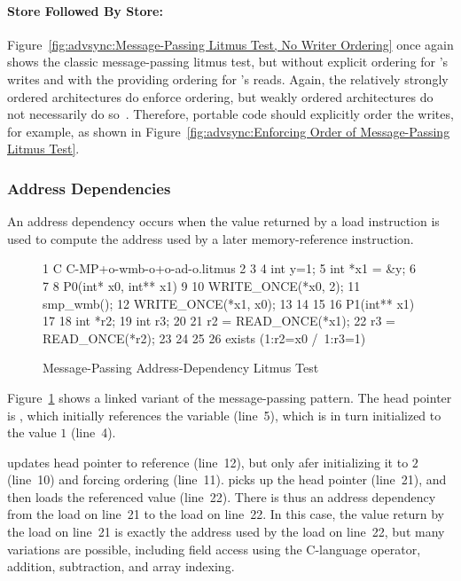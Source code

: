 \paragraph{Store Followed By Store:}
Figure~\ref{fig:advsync:Message-Passing Litmus Test, No Writer Ordering}
once again shows the classic message-passing litmus test, but without
explicit ordering for 's writes and with the 
providing ordering for 's reads.
Again, the relatively strongly ordered architectures do enforce ordering,
but weakly ordered architectures do not necessarily do
so~\cite{JadeAlglave2011ppcmem}.
Therefore, portable code should explicitly order the writes, for
example, as shown in
Figure~\ref{fig:advsync:Enforcing Order of Message-Passing Litmus Test}.

\subsubsection{Address Dependencies}
\label{sec:advsync:Address Dependencies}

An address dependency occurs when the value returned by a load instruction
is used to compute the address used by a later memory-reference
instruction.

\begin{figure}[tbp]
{ \scriptsize
\begin{verbbox}
 1 C C-MP+o-wmb-o+o-ad-o.litmus
 2
 3 {
 4 int y=1;
 5 int *x1 = &y;
 6 }
 7
 8 P0(int* x0, int** x1) {
 9
10   WRITE_ONCE(*x0, 2);
11   smp_wmb();
12   WRITE_ONCE(*x1, x0);
13
14 }
15
16 P1(int** x1) {
17
18   int *r2;
19   int r3;
20
21   r2 = READ_ONCE(*x1);
22   r3 = READ_ONCE(*r2);
23
24 }
25
26 exists (1:r2=x0 /\ 1:r3=1)
\end{verbbox}
}
\centering
\theverbbox
\caption{Message-Passing Address-Dependency Litmus Test}
\label{fig:advsync:Message-Passing Address-Dependency Litmus Test}
\end{figure}

Figure~\ref{fig:advsync:Message-Passing Address-Dependency Litmus Test}
shows a linked variant of the message-passing pattern.
The head pointer is , which initially
references the  variable  (line~5), which is in turn 
initialized to the value $1$ (line~4).

 updates head pointer  to reference  (line~12),
but only afer initializing it to $2$ (line~10) and forcing ordering
(line~11).
 picks up the head pointer  (line~21), and then loads
the referenced value (line~22).
There is thus an address dependency from the load on line~21 to the
load on line~22.
In this case, the value return by the load on line~21 is exactly the address
used by the load on line~22, but many variations are possible,
including field access using the C-language \co{->} operator,
addition, subtraction, and array indexing.

